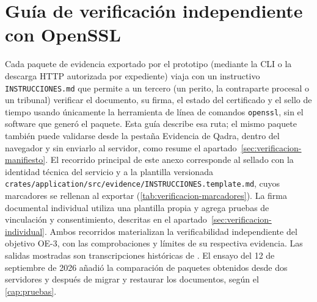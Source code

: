 \chapter[Guía de verificación independiente con OpenSSL]{Guía de verificación independiente\\ con OpenSSL}\label{anexo:verificacion}

Cada paquete de evidencia exportado por el prototipo (mediante la CLI o la descarga HTTP autorizada por expediente) viaja con un instructivo \texttt{INSTRUCCIONES.md} que permite a un tercero (un perito, la contraparte procesal o un tribunal) verificar el documento, su firma, el estado del certificado y el sello de tiempo usando únicamente la herramienta de línea de comandos \texttt{openssl}, sin el software que generó el paquete. Esta guía describe esa ruta; el mismo paquete también puede validarse desde la pestaña Evidencia de Qadra, dentro del navegador y sin enviarlo al servidor, como resume el apartado~\ref{sec:verificacion-manifiesto}. El recorrido principal de este anexo corresponde al sellado con la identidad técnica del servicio y a la plantilla versionada \texttt{crates/application/src/evidence/\allowbreak INSTRUCCIONES.template.md}, cuyos marcadores se rellenan al exportar (\cref{tab:verificacion-marcadores}). La firma documental individual utiliza una plantilla propia y agrega pruebas de vinculación y consentimiento, descritas en el apartado~\ref{sec:verificacion-individual}. Ambos recorridos materializan la verificabilidad independiente del objetivo OE-3, con las comprobaciones y límites de su respectiva evidencia. Las salidas mostradas son transcripciones históricas de . El ensayo del 12 de septiembre de 2026 añadió la comparación de paquetes obtenidos desde dos servidores y después de migrar y restaurar los documentos, según el \cref{cap:pruebas}.

